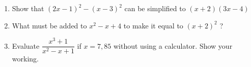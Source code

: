 \begin{eocexercises}{}
\begin{enumerate}[itemsep=5pt, label=\textbf{\arabic*}. ]
\item Show that ${(2x-1)}^{2}-{(x-3)}^{2}$ can be simplified to $(x+2)(3x-4)$

\item What must be added to ${x}^{2}-x+4$ to make it equal to ${(x+2)}^{2}$ ?
\item Evaluate $\dfrac{x^{3}+1}{x^{2}-x+1}$ if $x=7,85$ without using a calculator. Show your working.
\end{enumerate}

\end{eocexercises}
